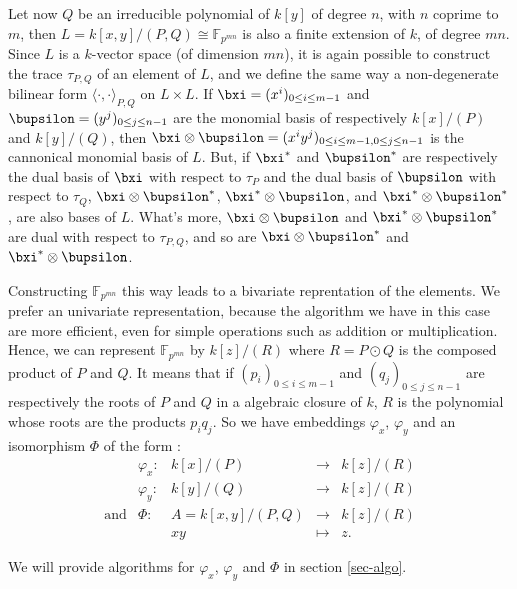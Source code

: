 \documentclass[a4paper,11pt]{article}
\theoremstyle{break}
\theoremstyle{definition}
\theoremstyle{remark}
\newcommand{\ps}[2]{\langle#1,#2\rangle}
\newcommand{\psdot}{\ps{\cdot}{\cdot}}
\begin{document}
Let now $Q$ be an irreducible polynomial of $k[y]$ of degree $n$, with $n$
coprime to $m$, then $L=k[x,y]/(P,Q)\cong \mathbb{F}_{p^{mn}}$ is also a finite 
extension of $k$, of
degree $mn$. Since $L$ is a $k$-vector space (of dimension $mn$), it is again
possible to construct the trace $\tau_{P,Q}$ of an element of $L$, and we define 
the same way
a non-degenerate bilinear form $\psdot_{P,Q}$ on $L\times L$. If
$\bxi=(x^i)_{0\leq i\leq m-1}$ and $\bupsilon=(y^j)_{0\leq j \leq n-1}$ are the
monomial basis of respectively $k[x]/(P)$ and $k[y]/(Q)$, then
$\bxi\otimes\bupsilon=(x^iy^j)_{0\leq i \leq m-1,0\leq j \leq n-1}$ is the
cannonical monomial basis of $L$. But, if $\bxi^*$ and $\bupsilon^*$ are
respectively the dual basis of $\bxi$ with respect to $\tau_P$ and the dual
basis of $\bupsilon$ with respect to $\tau_Q$, $\bxi\otimes\bupsilon^*$, 
$\bxi^*\otimes\bupsilon$, and $\bxi^*\otimes\bupsilon^*$, are also bases of $L$.
What's more, $\bxi\otimes\bupsilon$ and  $\bxi^*\otimes\bupsilon^*$ are dual
with respect to $\tau_{P,Q}$, and so are $\bxi\otimes\bupsilon^*$ and
$\bxi^*\otimes\bupsilon$.

Constructing
$\mathbb{F}_{p^{mn}}$ this way leads to a bivariate reprentation of the
elements. We prefer an univariate representation, because the algorithm we have
in this case are more efficient, even for simple operations such as addition or
multiplication. Hence, we can represent $\mathbb{F}_{p^{mn}}$ by $k[z]/(R)$
where $R=P\odot Q$ is the composed product of $P$ and $Q$. It means that if
$(p_i)_{0\leq i \leq m-1}$ and $(q_j)_{0\leq j\leq n-1}$ are respectively the
roots of $P$ and $Q$ in a algebraic closure of $k$, $R$ is the polynomial whose
roots are the products $p_iq_j$. So we have embeddings $\varphi_x$, $\varphi_y$
and an isomorphism $\Phi$ of the form :
\[
\begin{array}{ccccc}
  &\varphi_x: & k[x]/(P) & \to & k[z]/(R)\\[2mm]
  & \varphi_y: & k[y]/(Q) & \to & k[z]/(R)\\[2mm]
  \text{and}& \Phi:&  A=k[x,y]/(P,Q) & \to & k[z]/(R) \\
  & &  xy & \mapsto & z.
\end{array}
\]

We will provide algorithms for $\varphi_x$, $\varphi_y$ and $\Phi$ in section
\ref{sec-algo}.
\end{document}
